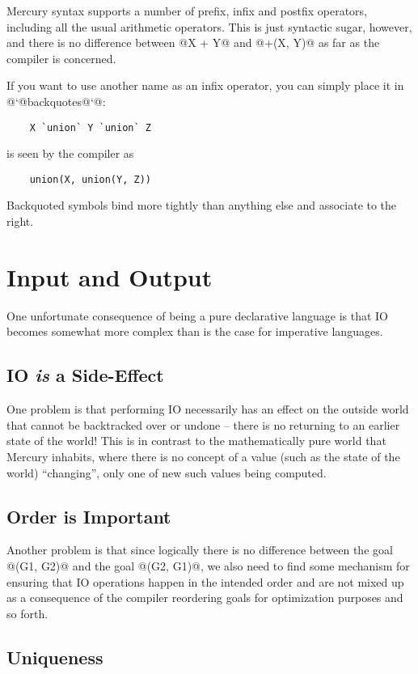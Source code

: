\documentclass[a4paper,11pt,notitlepage,onecolumn]{article}
\begin{document}
Mercury syntax supports a number of prefix, infix and postfix
operators, including all the usual arithmetic operators.  This
is just syntactic sugar, however, and there is no difference
between @X + Y@ and @+(X, Y)@ as far as the compiler is concerned.

If you want to use another name as an infix operator, you can
simply place it in @`@backquotes@`@:
\begin{verbatim}
    X `union` Y `union` Z
\end{verbatim}
is seen by the compiler as
\begin{verbatim}
    union(X, union(Y, Z))
\end{verbatim}
Backquoted symbols bind more tightly than anything else and
associate to the right.



\section{Input and Output}

One unfortunate consequence of being a pure declarative language
is that IO becomes somewhat more complex than is the case for
imperative languages.

\subsection{IO \emph{is} a Side-Effect}

One problem is that performing IO necessarily has an effect on the
outside world that cannot be backtracked over or undone -- there is
no returning to an earlier state of the world!  This is in
contrast to the mathematically pure world that Mercury inhabits,
where there is no concept of a value (such as the state of the
world) ``changing'', only one of new such values being computed.

\subsection{Order is Important}

Another problem is that since logically there is no difference
between the goal @(G1, G2)@ and the goal @(G2, G1)@, we also need to
find some mechanism for ensuring that IO operations happen in the
intended order and are not mixed up as a consequence of the
compiler reordering goals for optimization purposes and so forth.

\subsection{Uniqueness}
\end{document}

